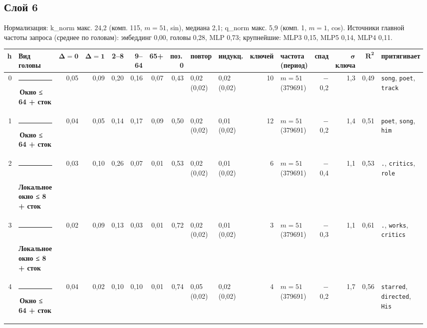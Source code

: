 \documentclass[10pt]{article}
\begin{document}
\noindent\begin{minipage}{\linewidth}
\subsection*{Слой 6}
{\small\color{ink2} Нормализация: k\_norm макс. 24,2 (комп. 115, $m{=}51$, sin), медиана 2,1; q\_norm макс. 5,9 (комп. 1, $m{=}1$, cos). Источники главной частоты запроса (среднее по головам): эмбеддинг 0,00, головы 0,28, MLP 0,73; крупнейшие: MLP3 0,15, MLP5 0,14, MLP4 0,11.}
\begin{center}{\footnotesize\begin{tabular}{|r|l|r|r|r|r|r|r|l|l|r|l|r|r|r|l|}
\hline
\rowcolor{head}\textbf{h} & \textbf{Вид головы} & $\boldsymbol{\Delta{=}0}$ & $\boldsymbol{\Delta{=}1}$ & \textbf{2–8} & \textbf{9–64} & \textbf{65+} & \textbf{поз.\,0} & \textbf{повтор} & \textbf{индукц.} & \textbf{ключей} & \textbf{частота (период)} & \textbf{спад} & $\boldsymbol{\sigma}$ \textbf{ключа} & $\boldsymbol{R^2}$ & \textbf{притягивает} \\ \hline
0 & \textcolor[HTML]{EDA100}{\rule{0.62em}{0.62em}}\,\textbf{Окно ≤ 64 + сток} & 0,05 & 0,09 & 0,20 & 0,16 & 0,07 & 0,43 & 0,02 (0,02) & 0,02 (0,02) & 10 & $m{=}51$ (379691) & $-$0,2 & 1,3 & 0,49 & \texttt{\textvisiblespace{}song}, \texttt{\textvisiblespace{}poet}, \texttt{\textvisiblespace{}track} \\ \hline
1 & \textcolor[HTML]{EDA100}{\rule{0.62em}{0.62em}}\,\textbf{Окно ≤ 64 + сток} & 0,04 & 0,05 & 0,14 & 0,17 & 0,09 & 0,50 & 0,02 (0,02) & 0,01 (0,02) & 12 & $m{=}51$ (379691) & $-$0,2 & 1,4 & 0,51 & \texttt{\textvisiblespace{}poet}, \texttt{\textvisiblespace{}song}, \texttt{\textvisiblespace{}him} \\ \hline
2 & \textcolor[HTML]{1BAF7A}{\rule{0.62em}{0.62em}}\,\textbf{Локальное окно ≤ 8 + сток} & 0,03 & 0,10 & 0,26 & 0,07 & 0,01 & 0,53 & 0,02 (0,02) & 0,01 (0,02) & 6 & $m{=}51$ (379691) & $-$0,4 & 1,1 & 0,53 & \texttt{\textvisiblespace{}.}, \texttt{\textvisiblespace{}critics}, \texttt{\textvisiblespace{}role} \\ \hline
3 & \textcolor[HTML]{1BAF7A}{\rule{0.62em}{0.62em}}\,\textbf{Локальное окно ≤ 8 + сток} & 0,02 & 0,09 & 0,13 & 0,03 & 0,01 & 0,72 & 0,02 (0,02) & 0,01 (0,02) & 3 & $m{=}51$ (379691) & $-$0,3 & 1,1 & 0,61 & \texttt{\textvisiblespace{}.}, \texttt{\textvisiblespace{}works}, \texttt{\textvisiblespace{}critics} \\ \hline
4 & \textcolor[HTML]{EDA100}{\rule{0.62em}{0.62em}}\,\textbf{Окно ≤ 64 + сток} & 0,04 & 0,02 & 0,10 & 0,10 & 0,01 & 0,74 & 0,05 (0,02) & 0,02 (0,02) & 4 & $m{=}51$ (379691) & $-$0,2 & 1,7 & 0,56 & \texttt{\textvisiblespace{}starred}, \texttt{\textvisiblespace{}directed}, \texttt{\textvisiblespace{}His} \\ \hline

\end{tabular}}
\end{center}
\end{minipage}
\end{document}
